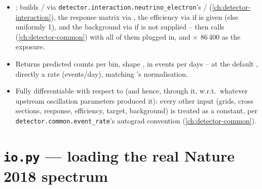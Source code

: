 \begin{implbox}
\begin{itemize}
  \item {}: builds
    / via
    \texttt{detector.interaction.neutrino\_electron}'s
    /
    (\cref{ch:detector-interaction}), the response matrix via
    , the efficiency via
     if
     is given (else uniformly 1), and the background
    via  if
     is not supplied -- then calls
    (\cref{ch:detector-common}) with all of them plugged in, and
     $\times$ 86\,400 as the exposure.
  \item Returns predicted counts per bin, shape , in
    events per  days -- at the default
    , directly a rate (events/day), matching
    's normalisation.
  \item Fully differentiable with respect to  (and hence, through
    it, w.r.t.\ whatever upstream oscillation parameters produced it): every
    other input (grids, cross sections, response, efficiency, target,
    background) is treated as a constant, per
    \texttt{detector.common.event\_rate}'s autograd convention
    (\cref{ch:detector-common}).
\end{itemize}
\end{implbox}

\section{\texttt{io.py} --- loading the real Nature 2018 spectrum}


